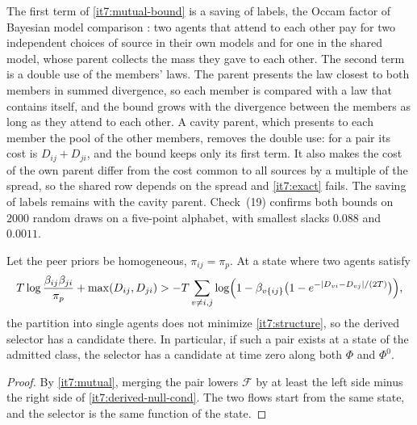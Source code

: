 \documentclass[11pt,letterpaper]{report}
\begin{document}
The first term of \cref{it7:mutual-bound} is a saving of labels, the Occam factor of Bayesian model comparison \citep{MacKay1992}: two agents that attend to each other pay for two independent choices of source in their own models and for one in the shared model, whose parent collects the mass they gave to each other. The second term is a double use of the members' laws. The parent presents the law closest to both members in summed divergence, so each member is compared with a law that contains itself, and the bound grows with the divergence between the members as long as they attend to each other. A cavity parent, which presents to each member the pool of the other members, removes the double use: for a pair its cost is $D_{ij}+D_{ji}$, and the bound keeps only its first term. It also makes the cost of the own parent differ from the cost common to all sources by a multiple of the spread, so the shared row depends on the spread and \cref{it7:exact} fails. The saving of labels remains with the cavity parent. Check~(19) confirms both bounds on $2000$ random draws on a five-point alphabet, with smallest slacks $0.088$ and $0.0011$.

Let the peer priors be homogeneous, $\pi_{ij}=\pi_p$. At a state where two agents satisfy
\begin{equation}
T\log\frac{\beta_{ij}\beta_{ji}}{\pi_p}+\max(D_{ij},D_{ji})>-T\sum_{v\ne i,j}\log\Bigl(1-\beta_{v\{ij\}}\bigl(1-e^{-|D_{vi}-D_{vj}|/(2T)}\bigr)\Bigr),
\label{it7:derived-null-cond}
\end{equation}
the partition into single agents does not minimize \cref{it7:structure}, so the derived selector has a candidate there. In particular, if such a pair exists at a state of the admitted class, the selector has a candidate at time zero along both $\Phi$ and $\Phi^0$.
\begin{proof}
By \cref{it7:mutual}, merging the pair lowers $\mathcal F$ by at least the left side minus the right side of \cref{it7:derived-null-cond}. The two flows start from the same state, and the selector is the same function of the state.
\end{proof}
\end{document}
